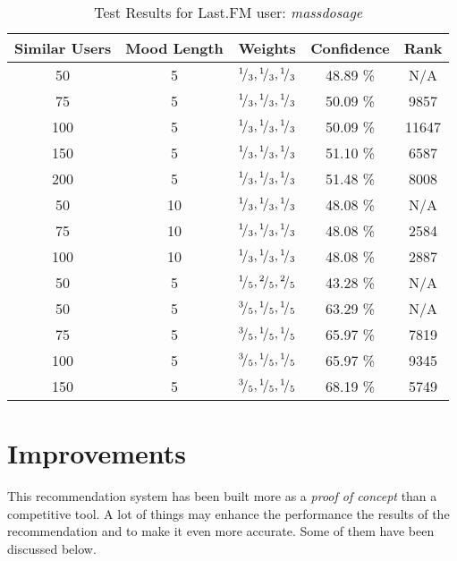 \begin{table}[h!]
\centering
\begin{tabular}{ | c | c | c || c | c | }
\hline
Similar Users	& Mood Length	& Weights							&Confidence	&Rank\\
\hline \hline
50			& 5			& \({}^{1}\!/_{3}, {}^{1}\!/_{3}, {}^{1}\!/_{3}\)	&48.89 \%		&N/A\\
\hline
75			& 5			& \({}^{1}\!/_{3}, {}^{1}\!/_{3}, {}^{1}\!/_{3}\)	&50.09 \%		&9857\\
\hline
100			& 5			& \({}^{1}\!/_{3}, {}^{1}\!/_{3}, {}^{1}\!/_{3}\)	&50.09 \%		&11647\\
\hline
150			& 5			& \({}^{1}\!/_{3}, {}^{1}\!/_{3}, {}^{1}\!/_{3}\)	&51.10 \%		&6587\\
\hline
200			& 5			& \({}^{1}\!/_{3}, {}^{1}\!/_{3}, {}^{1}\!/_{3}\)	&51.48 \%		&8008\\
\hline
50			& 10			& \({}^{1}\!/_{3}, {}^{1}\!/_{3}, {}^{1}\!/_{3}\)	&48.08 \%		&N/A\\
\hline
75			& 10			& \({}^{1}\!/_{3}, {}^{1}\!/_{3}, {}^{1}\!/_{3}\)	&48.08 \%		&2584\\
\hline
100			& 10			& \({}^{1}\!/_{3}, {}^{1}\!/_{3}, {}^{1}\!/_{3}\)	&48.08 \%		&2887\\
\hline
50			& 5			& \({}^{1}\!/_{5}, {}^{2}\!/_{5}, {}^{2}\!/_{5}\)	&43.28 \%		&N/A\\
\hline
50			& 5			& \({}^{3}\!/_{5}, {}^{1}\!/_{5}, {}^{1}\!/_{5}\)	&63.29 \%		&N/A\\
\hline
75			& 5			& \({}^{3}\!/_{5}, {}^{1}\!/_{5}, {}^{1}\!/_{5}\)	&65.97 \%		&7819\\
\hline
100			& 5			& \({}^{3}\!/_{5}, {}^{1}\!/_{5}, {}^{1}\!/_{5}\)	&65.97 \%		&9345\\
\hline
150			& 5			& \({}^{3}\!/_{5}, {}^{1}\!/_{5}, {}^{1}\!/_{5}\)	&68.19 \%		&5749\\
\hline
\end{tabular}
\caption{Test Results for Last.FM user: \emph{massdosage}}
\label{table:test_results_massdosage}
\end{table}
	
	\section{Improvements}
		This recommendation system has been built more as a \emph{proof of concept} than a competitive tool. A lot of things may enhance the performance the results of the recommendation and to make it even more accurate. Some of them have been discussed below.

